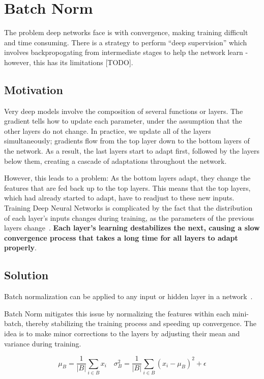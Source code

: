 \documentclass[11pt]{article}
\begin{document}
\section{Batch Norm}

The problem deep networks face is with convergence, making training difficult and time consuming. There is a strategy to perform ``deep supervision'' which involves backpropogating from intermediate stages to help the network learn - however, this has its limitations [TODO].

\subsection{Motivation}

Very deep models involve the composition of several functions or layers. The gradient tells how to update each parameter, under the assumption that the other layers do not change. In practice, we update all of the layers simultaneously; gradients flow from the top layer down to the bottom layers of the network. As a result, the last layers start to adapt first, followed by the layers below them, creating a cascade of adaptations throughout the network. 

However, this leads to a problem: As the bottom layers adapt, they change the features that are fed back up to the top layers. This means that the top layers, which had already started to adapt, have to readjust to these new inputs. Training Deep Neural Networks is complicated by the fact that the distribution of each layer's inputs changes during training, as the parameters of the previous layers change~\cite{Goodfellow-et-al-2016}. \textbf{Each layer's learning destabilizes the next, causing a slow convergence process that takes a long time for all layers to adapt properly}.

\subsection{Solution}

Batch normalization can be applied to any input or hidden layer in a network~\cite{Goodfellow-et-al-2016}.

Batch Norm mitigates this issue by normalizing the features within each mini-batch, thereby stabilizing the training process and speeding up convergence. The idea is to make minor corrections to the layers by adjusting their mean and variance during training.

\begin{equation*}
    \mu_B = \frac 1 {|B|}\sum_{i\in B} x_i \quad \sigma^2_B = \frac 1 {|B|} \sum _{i\in B} (x_i - \mu_B)^2 + \epsilon
\end{equation*}
\end{document}
